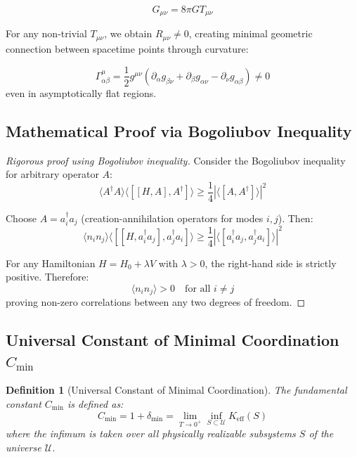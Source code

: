 \documentclass[11pt,a4paper]{article}
\newtheorem{definition}{Definition}
\begin{document}
\begin{equation}
	G_{\mu\nu} = 8\pi G T_{\mu\nu}
\end{equation}

For any non-trivial $T_{\mu\nu}$, we obtain $R_{\mu\nu} \neq 0$, creating minimal geometric connection between spacetime points through curvature:

\begin{equation}
	\Gamma^\mu_{\alpha\beta} = \frac{1}{2} g^{\mu\nu}(\partial_\alpha g_{\beta\nu} + \partial_\beta g_{\alpha\nu} - \partial_\nu g_{\alpha\beta}) \neq 0
\end{equation}
even in asymptotically flat regions.

\subsection{Mathematical Proof via Bogoliubov Inequality}

\begin{proof}[Rigorous proof using Bogoliubov inequality]
	Consider the Bogoliubov inequality for arbitrary operator $A$:
	\begin{equation}
		\langle A^\dagger A \rangle \langle [[H, A], A^\dagger] \rangle \geq \frac{1}{4} |\langle [A, A^\dagger] \rangle|^2
	\end{equation}
	
	Choose $A = a_i^\dagger a_j$ (creation-annihilation operators for modes $i,j$). Then:
	\begin{equation}
		\langle n_i n_j \rangle \langle [[H, a_i^\dagger a_j], a_j^\dagger a_i] \rangle \geq \frac{1}{4} |\langle [a_i^\dagger a_j, a_j^\dagger a_i] \rangle|^2
	\end{equation}
	
	For any Hamiltonian $H = H_0 + \lambda V$ with $\lambda > 0$, the right-hand side is strictly positive. Therefore:
	\begin{equation}
		\langle n_i n_j \rangle > 0 \quad \text{for all } i \neq j
	\end{equation}
	proving non-zero correlations between any two degrees of freedom.
\end{proof}

\subsection{Universal Constant of Minimal Coordination $C_{\min}$}

\begin{definition}[Universal Constant of Minimal Coordination]
	The fundamental constant $C_{\min}$ is defined as:
	\begin{equation}
		C_{\min} = 1 + \delta_{\min} = \lim_{T \to 0^+} \inf_{S \subset \mathcal{U}} K_{\mathrm{eff}}(S)
	\end{equation}
	where the infimum is taken over all physically realizable subsystems $S$ of the universe $\mathcal{U}$.
\end{definition}
\end{document}
